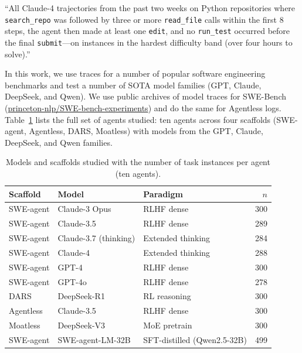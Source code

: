 \documentclass[11pt]{article}
\begin{document}
  \begin{tcolorbox}[colback=black!3, colframe=black!30, boxrule=0.4pt, left=10pt, right=10pt, top=8pt, bottom=8pt,
  fontupper=\small]
  ``All Claude-4 trajectories from the past two weeks on Python repositories where \texttt{search\_repo} was followed by
  three or more \texttt{read\_file} calls within the first 8 steps, the agent then made at least one \texttt{edit}, and no
  \texttt{run\_test} occurred before the final \texttt{submit}---on instances in the hardest difficulty band (over four hours to solve).''
  \end{tcolorbox}

  In this work, we use traces for a number of popular software engineering benchmarks and test a number of SOTA model
  families (GPT, Claude, DeepSeek, and Qwen). We use public archives of model traces for SWE-Bench
  (\url{princeton-nlp/SWE-bench-experiments}) and do the same for Agentless logs. Table~\ref{tab:models} lists the full set
  of agents studied: ten agents across four scaffolds (SWE-agent, Agentless, DARS, Moatless) with models from the GPT,
  Claude, DeepSeek, and Qwen families.

  \begin{table}[H]
  \centering\small
  \begin{tabular}{lllr}
  \toprule
  \textbf{Scaffold} & \textbf{Model} & \textbf{Paradigm} & \textbf{$n$} \\
  \midrule
  \rowcolor{claudebg} SWE-agent & Claude-3 Opus        & RLHF dense        & 300 \\
  \rowcolor{claudebg} SWE-agent & Claude-3.5           & RLHF dense        & 289 \\
  \rowcolor{claudebg} SWE-agent & Claude-3.7 (thinking)& Extended thinking & 284 \\
  \rowcolor{claudebg} SWE-agent & Claude-4             & Extended thinking & 288 \\
  \rowcolor{gptbg}    SWE-agent & GPT-4                & RLHF dense        & 300 \\
  \rowcolor{gptbg}    SWE-agent & GPT-4o               & RLHF dense        & 278 \\
  \rowcolor{owbg}     DARS      & DeepSeek-R1          & RL reasoning      & 300 \\
  \rowcolor{owbg}     Agentless & Claude-3.5           & RLHF dense        & 300 \\
  \rowcolor{owbg}     Moatless  & DeepSeek-V3          & MoE pretrain      & 300 \\
  \rowcolor{owbg}     SWE-agent & SWE-agent-LM-32B & SFT-distilled (Qwen2.5-32B) & 499 \\
  \bottomrule
  \end{tabular}
  \caption{Models and scaffolds studied with the number of task instances per agent (ten agents).}
  \label{tab:models}
  \end{table}
\end{document}
